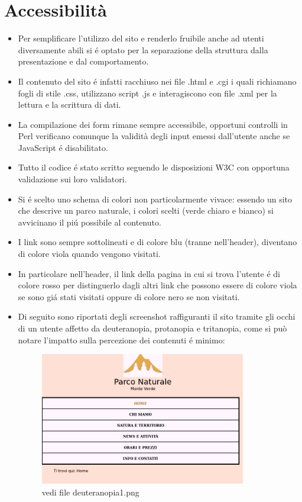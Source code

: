 \documentclass[12pt]{article}
\begin{document}
		\section{Accessibilit\`a}
		\begin{itemize}
			\item Per semplificare l'utilizzo del sito e renderlo fruibile anche ad utenti diversamente abili si \'e optato per la separazione della struttura dalla presentazione e dal comportamento.
			\item Il contenuto del sito \'e  infatti racchiuso nei file .html e .cgi i quali richiamano fogli di stile .css, utilizzano script .js e interagiscono con file .xml per la lettura e la scrittura di dati.
			\item La compilazione dei form rimane sempre accessibile, opportuni controlli in Perl verificano comunque la validit\`a degli input emessi dall'utente anche se JavaScript \'e disabilitato.

			\item Tutto il codice \'e stato scritto seguendo le disposizioni W3C con opportuna validazione sui loro validatori.
		
				\item Si \'e scelto uno schema di colori non particolarmente vivace: essendo un sito che descrive un parco naturale, i colori scelti (verde chiaro e bianco) si avvicinano il pi\'u possibile al contenuto.

				\item I link sono sempre sottolineati e di colore blu (tranne nell'header), diventano di colore viola quando vengono visitati.
				\item In particolare nell'header, il link della pagina in cui si trova l'utente \'e di colore rosso per distinguerlo dagli altri link che possono essere di colore viola se sono gi\'a stati visitati oppure di colore nero se non visitati.

			\item Di seguito sono riportati degli screenshot raffiguranti il sito tramite gli occhi di un utente affetto da deuteranopia, protanopia e tritanopia, come si può notare l'impatto sulla percezione dei contenuti \'e minimo:

			\begin{figure}
			\centering
			\includegraphics[width=90mm]{deuteranopia1}
			\caption{vedi file deuteranopia1.png}
			\end{figure} 


\end{itemize}
\end{document}
